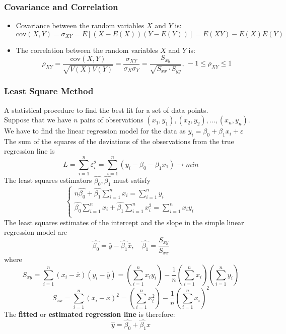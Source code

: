 \subsubsection*{Covariance and Correlation}
\begin{itemize}
  \setlength\itemsep{0cm}
  \item Covariance between the random variables $X$ and $Y$ is: $$ \text{cov}(X, Y) = \sigma_{XY} = E[(X-E(X))(Y - E(Y))] = E(XY) - E(X)E(Y) $$
  \item The correlation between the random variables $X$ and $Y$ is: $$ \rho_{XY} = \dfrac{\text{cov}(X,Y)}{\sqrt{V(X)V(Y)}} = \dfrac{\sigma_{XY}}{\sigma_X\sigma_Y} = \dfrac{S_{xy}}{\sqrt{S_{xx}\cdot S_{yy}}} \text{, } -1 \leq  \rho_{XY} \leq 1 $$
\end{itemize}

\subsubsection*{Least Square Method}
A statistical procedure to find the best fit for a set of data points.\\
Suppose that we have $n$ pairs of observations $(x_1, y_1), (x_2, y_2), ..., (x_n, y_n)$. We have to find the linear regression model for the data as $ y_i = \beta_0 + \beta_1 x_i + \varepsilon $\\
The sum of the squares of the deviations of the observations from the true regression line is 
$$ L = \sum_{i=1}^{n}\varepsilon^2_i = \sum_{i=1}^{n} (y_i - \beta_0 -\beta_1x_1) \rightarrow min $$
The least squares estimators $\hat{\beta_0}, \hat{\beta_1}$ must satisfy
\[
\begin{cases}
  \displaystyle
    n\hat{\beta_0} + \hat{\beta_1} \sum_{i=1}^{n}x_i = \sum_{i=1}^{n}y_i \\
  \displaystyle
    \hat{\beta_0} \sum_{i=1}^{n}x_i + \hat{\beta_1} \sum_{i=1}^{n}x_i^2 = \sum_{i=1}^{n}x_iy_i \\
\end{cases}
\]
The least squares estimates of the intercept and the slope in the simple linear regression model are $$ \hat{\beta_0} = \bar{y} - \hat{\beta_1} \bar{x}, \quad \hat{\beta_1} = \dfrac{S_{xy}}{S_{xx}} $$
where $$ S_{xy} = \sum_{i=1}^{n} (x_i - \bar{x})(y_i - \bar{y}) = \left( \sum_{i=1}^{n}x_iy_i \right) - \dfrac{1}{n}\left( \sum_{i=1}^{n}x_i \right)\left( \sum_{i=1}^{n}y_i \right) $$
$$ S_{xx} = \sum_{i=1}^{n} (x_i - \bar{x})^2 = \left( \sum_{i=1}^{n}x_i^2 \right) - \dfrac{1}{n}\left( \sum_{i=1}^{n}x_i \right)^2 $$
The \textbf{fitted} or \textbf{estimated regression line} is therefore: $$ \hat{y} = \hat{\beta_0} + \hat{\beta_1}x $$

